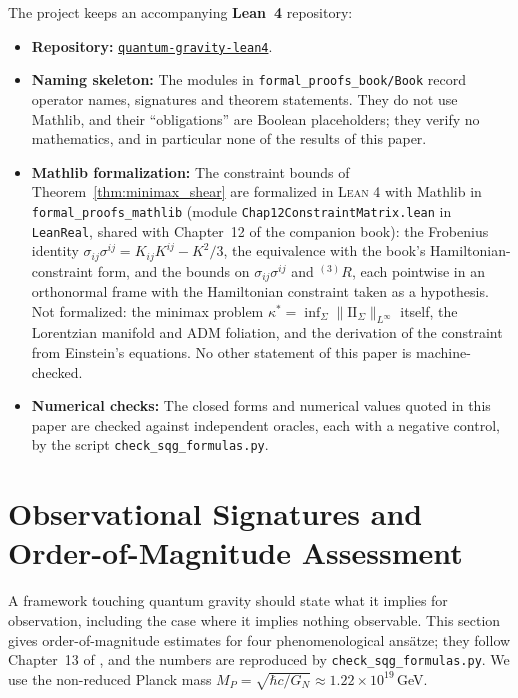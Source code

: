 \documentclass[11pt,a4paper,reqno]{amsart}
\theoremstyle{definition}
\numberwithin{equation}{section}
\begin{document}
The project keeps an accompanying \textbf{Lean~4} repository:
\begin{itemize}[leftmargin=1.8em]
    \item \textbf{Repository:} \href{https://github.com/reinaldomsilvafilho-netizen/quantum-gravity-lean4}{\texttt{quantum-gravity-lean4}}.
    \item \textbf{Naming skeleton:} The modules in \texttt{formal\_\allowbreak proofs\_\allowbreak book/\allowbreak Book} record operator names, signatures and theorem statements. They do not use Mathlib, and their ``obligations'' are Boolean placeholders; they verify no mathematics, and in particular none of the results of this paper.
    \item \textbf{Mathlib formalization:} The constraint bounds of Theorem~\ref{thm:minimax_shear} are formalized in \textsc{Lean 4} with Mathlib in \texttt{formal\_\allowbreak proofs\_\allowbreak mathlib} (module \texttt{Chap12\allowbreak Constraint\allowbreak Matrix.lean} in \texttt{LeanReal}, shared with Chapter~12 of the companion book): the Frobenius identity $\sigma_{ij}\sigma^{ij} = K_{ij}K^{ij} - K^2/3$, the equivalence with the book's Hamiltonian-constraint form, and the bounds on $\sigma_{ij}\sigma^{ij}$ and ${}^{(3)}R$, each pointwise in an orthonormal frame with the Hamiltonian constraint taken as a hypothesis. Not formalized: the minimax problem $\kappa^\ast = \inf_\Sigma \|\mathrm{II}_\Sigma\|_{L^\infty}$ itself, the Lorentzian manifold and ADM foliation, and the derivation of the constraint from Einstein's equations. No other statement of this paper is machine-checked.
    \item \textbf{Numerical checks:} The closed forms and numerical values quoted in this paper are checked against independent oracles, each with a negative control, by the script \texttt{check\_\allowbreak sqg\_\allowbreak formulas.py}.
\end{itemize}

\section{Observational Signatures and Order-of-Magnitude Assessment}
\label{sec:experimental_signatures}

A framework touching quantum gravity should state what it implies for observation, including the case where it implies nothing observable. This section gives order-of-magnitude estimates for four phenomenological ans\"atze; they follow Chapter~13 of \cite{silvafilho2026treatise}, and the numbers are reproduced by \texttt{check\_\allowbreak sqg\_\allowbreak formulas.py}. We use the non-reduced Planck mass $M_P = \sqrt{\hbar c/G_N} \approx 1.22 \times 10^{19}$\,GeV.
\end{document}

